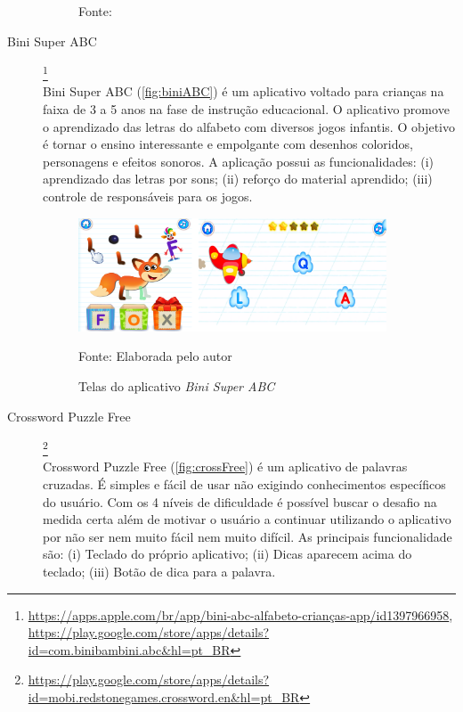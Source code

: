 \begin{description}
\begin{figure}[ht!]
    Fonte: \cite{HumanAnatomyAtlas}
\end{figure}

\item[Bini Super ABC]\footnote{\url{https://apps.apple.com/br/app/bini-abc-alfabeto-crianças-app/id1397966958}, \url{https://play.google.com/store/apps/details?id=com.binibambini.abc&hl=pt_BR}} \hfill \\
Bini Super ABC (\autoref{fig:biniABC}) é um aplicativo voltado para crianças na faixa de 3 a 5 anos na fase de instrução educacional. O aplicativo promove o aprendizado das letras do alfabeto com diversos jogos infantis. O objetivo é tornar o ensino interessante e empolgante com desenhos coloridos, personagens e efeitos sonoros. A aplicação possui as funcionalidades: (i) aprendizado das letras por sons; (ii) reforço do material aprendido; (iii) controle de responsáveis para os jogos.

\begin{figure}[H]
\centering
    \caption{Telas do aplicativo \textit{Bini Super ABC}}
    \label{fig:biniABC}
    \includegraphics[width=0.9\textwidth]{Figuras/biniabc.png}
    
    Fonte: Elaborada pelo autor
\end{figure}

\item[Crossword Puzzle Free]\footnote{\url{https://play.google.com/store/apps/details?id=mobi.redstonegames.crossword.en&hl=pt_BR}} \hfill \\
Crossword Puzzle Free (\autoref{fig:crossFree}) é um aplicativo de palavras cruzadas. É simples e fácil de usar não exigindo conhecimentos específicos do usuário. Com os 4 níveis de dificuldade é possível buscar o desafio na medida certa além de motivar o usuário a continuar utilizando o aplicativo por não ser nem muito fácil nem muito difícil. As principais funcionalidade são: (i) Teclado do próprio aplicativo; (ii) Dicas aparecem acima do teclado; (iii) Botão de dica para a palavra.



\end{description}
